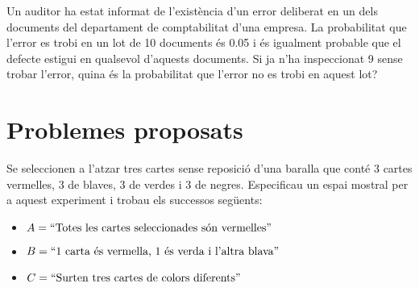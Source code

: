 \begin{probres} {Un auditor ha estat informat de l'exist\`encia d'un error
deliberat en un dels documents del departament de comptabilitat d'una empresa. La
probabilitat que l'error es trobi en un lot de 10 documents \'es 0.05 i \'es
igualment probable que el defecte estigui en qualsevol d'aquests documents. Si ja
n'ha inspeccionat 9 sense trobar l'error, quina \'es la probabilitat que
l'error no es trobi en aquest lot?}
\end{probres}


\newpage

\section{Problemes proposats}

\begin{prob}
{Se seleccionen a l'atzar tres cartes sense reposici\'o d'una baralla
que cont\'e 3 cartes vermelles, 3 de blaves, 3 de verdes i 3 de negres. Especificau
un espai mostral per a aquest experiment i trobau els successos seg\"uents:
\begin{itemize}
\item {$A=``\hbox{Totes les cartes seleccionades s\'on vermelles''}$}
\item {$B=``\hbox{1 carta \'es vermella, 1 \'es verda i l'altra blava''}$} 
\item {$C=``\hbox{Surten tres cartes de colors diferents''}$}
\end{itemize}}
\end{prob}

